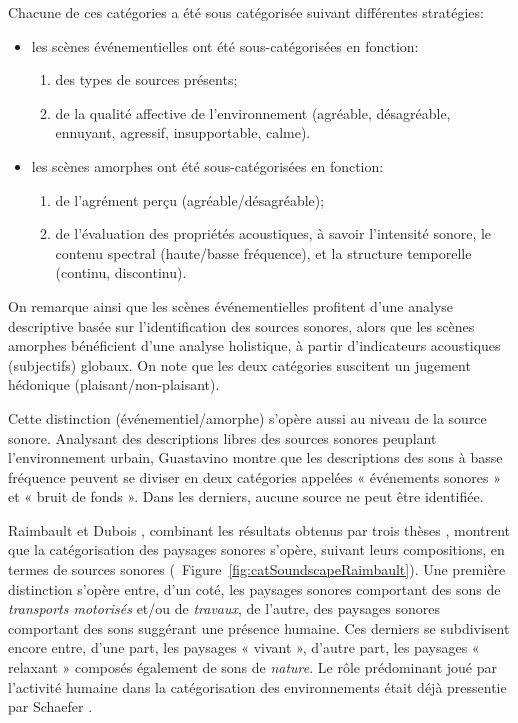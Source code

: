 Chacune de ces catégories a été sous catégorisée suivant différentes stratégies:

\begin{itemize}
\item les scènes événementielles ont été sous-catégorisées en fonction:
\begin{enumerate}
\item des types de sources présents;
\item de la qualité affective de l'environnement (agréable, désagréable, ennuyant, agressif, insupportable, calme).
\end{enumerate}
\item les scènes amorphes ont été sous-catégorisées en fonction:
\begin{enumerate}
\item de l'agrément perçu (agréable/désagréable);
\item de l'évaluation des propriétés acoustiques, à savoir l'intensité sonore, le contenu spectral (haute/basse fréquence), et la structure temporelle (continu, discontinu).
\end{enumerate}
\end{itemize}

On remarque ainsi que les scènes événementielles profitent d'une analyse descriptive basée sur l'identification des sources sonores, alors que les scènes amorphes bénéficient d'une analyse holistique, à partir d'indicateurs acoustiques (subjectifs) globaux. On note que les deux catégories suscitent un jugement hédonique (plaisant/non-plaisant).

Cette distinction (événementiel/amorphe) s'opère aussi au niveau de la source sonore. Analysant des descriptions libres des sources sonores peuplant l’environnement urbain, Guastavino montre que les descriptions des sons à basse fréquence peuvent se diviser en deux catégories appelées « événements sonores » et « bruit de fonds ». Dans les derniers, aucune source ne peut être identifiée.

Raimbault et Dubois \citep{raimbault2005urban}, combinant les résultats obtenus par trois thèses \citep{maffiolo_caracterisation_1999, raimbault2002simulation, guastavino_etude_2003}, montrent que la catégorisation des paysages sonores s'opère, suivant leurs compositions, en termes de sources sonores (\cf~Figure~\ref{fig:catSoundscapeRaimbault}). Une première distinction s'opère entre, d'un coté, les paysages sonores comportant des sons de \emph{transports motorisés} et/ou de \emph{travaux}, de l'autre, des paysages sonores comportant des sons suggérant une présence humaine. Ces derniers se subdivisent encore entre, d'une part, les paysages « vivant », d'autre part, les paysages « relaxant » composés également de sons de \emph{nature}. Le rôle prédominant joué par l'activité humaine dans la catégorisation des environnements était déjà pressentie par Schaefer \citep{schafer1977tuning}.

